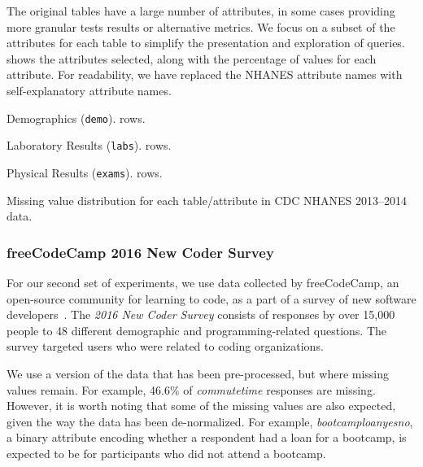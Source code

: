 The original tables have a large number of attributes, in some cases providing more granular tests results or alternative metrics.
We focus on a subset of the attributes for each table to simplify the presentation and exploration of queries.
 shows the attributes selected, along with the percentage of \nullv{} values for each attribute.
For readability, we have replaced the NHANES attribute names with self-explanatory attribute names.

\begin{table}
  \centering
  \begin{subtable}{0.5\textwidth}
    \centering
    
    \caption{Demographics (\texttt{demo}). \demorows{} rows.}
  \end{subtable}
  \par\medskip
  \begin{subtable}{0.5\textwidth}
    \centering
    
    \caption{Laboratory Results (\texttt{labs}). \labexrows{} rows.}
  \end{subtable}
  \par\medskip  
  \begin{subtable}{0.5\textwidth}
    \centering
    
    \caption{Physical Results (\texttt{exams}). \labexrows{} rows.}
  \end{subtable}
  \par\medskip  
  \caption{Missing value distribution for each table/attribute in CDC NHANES 2013--2014 data.}\label{table:nhanes-description} 
\end{table}

\subsubsection{freeCodeCamp 2016 New Coder Survey}
For our second set of experiments, we use data collected by freeCodeCamp, an open-source
community for learning to code, as a part of a survey of new software
developers~\cite{fcc-data}.  The \textit{2016 New Coder Survey} consists of responses by
over 15,000 people to 48 different demographic and programming-related questions.  The
survey targeted users who were related to coding organizations.

We use a version of the data that has been pre-processed, but where missing values remain.
For example, 46.6\% of \textit{commutetime} responses are missing. However, it is worth
noting that some of the missing values are also expected, given the way the data has been
de-normalized. For example, \textit{bootcamploanyesno}, a binary attribute encoding whether
a respondent had a loan for a bootcamp, is expected to be \nullv{} for participants who did not
attend a bootcamp.

